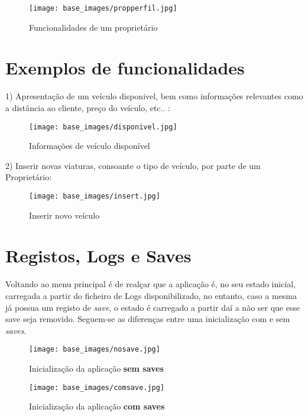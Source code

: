 \documentclass[a4paper,11pt]{report}
\begin{document}
   \begin{figure}[H]
        \centering
        \texttt{[image: base\_images/propperfil.jpg]}
        \label{img:logo}
        \caption{Funcionalidades de um proprietário}
    \end{figure}
    
\vspace{0.5cm}
\section{Exemplos de funcionalidades}

\hspace{0.5cm} 1) Apresentação de um veículo disponivel, bem como informações relevantes como a distância ao cliente, preço do veículo, etc.. :
   \begin{figure}[H]
        \centering
        \texttt{[image: base\_images/disponivel.jpg]}
        \label{img:logo}
        \caption{Informações de veículo disponível}
    \end{figure}
   \vspace{3cm} 
2) Inserir novas viaturas, consoante o tipo de veículo, por parte de um Proprietário:

   \begin{figure}[H]
        \centering
        \texttt{[image: base\_images/insert.jpg]}
        \label{img:logo}
        \caption{Inserir novo veículo}
    \end{figure}

\section{Registos, Logs e Saves}

\hspace{0.5cm} Voltando ao menu principal é de realçar que a aplicação é, no seu estado inicial, carregada a partir do ficheiro de Logs disponibilizado, no entanto, caso a mesma já possua um registo de \textit{save}, o estado é carregado a partir daí a não ser que esse save seja removido. Seguem-se as diferenças entre uma inicialização com e sem \textit{saves}.

   \begin{figure}[H]
        \centering
        \texttt{[image: base\_images/nosave.jpg]}
        \label{img:logo}
        \caption{Inicialização da aplicação \textbf{sem saves}}
    \end{figure}
    
   \begin{figure}[H]
        \centering
        \texttt{[image: base\_images/comsave.jpg]}
        \label{img:logo}
        \caption{Inicialização da aplicação \textbf{com saves}}
\vspace{2cm}
    \end{figure}
\end{document}
